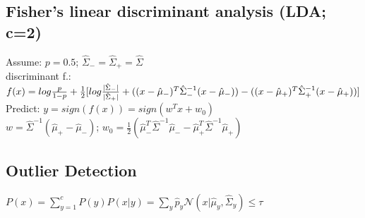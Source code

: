 

\subsection*{Fisher's linear discriminant analysis (LDA; c=2)}
Assume: $p = 0.5$; $\hat{\Sigma}_- = \hat{\Sigma}_+ = \hat{\Sigma}$\\
discriminant f.: $f(x) = log \frac{p}{1-p} + \frac{1}{2}[log \frac{|\hat{\Sigma}_-|}{|\hat{\Sigma}_+|}\\
+ ((x - \hat{\mu}_-)^T \hat{\Sigma}_-^{-1} (x - \hat{\mu}_-)) - ((x - \hat{\mu}_+)^T \hat{\Sigma}_+^{-1} (x - \hat{\mu}_+))]$\\
Predict: $y = sign(f(x)) = sign (w^T x + w_0)$\\
$w = \hat{\Sigma}^{-1}(\hat{\mu}_+ - \hat{\mu}_-)$; $w_0 = \frac{1}{2}(\hat{\mu}_-^T\hat{\Sigma}^{-1}\hat{\mu}_- - \hat{\mu}_+^T \hat{\Sigma}^{-1}\hat{\mu}_+)$

\subsection*{Outlier Detection}
$P(x) = \sum_{y=1}^c P(y) P(x|y) = \sum_y \hat{p}_y \mathcal{N}(x|\hat{\mu}_y,\hat{\Sigma}_y) \leq \tau$





